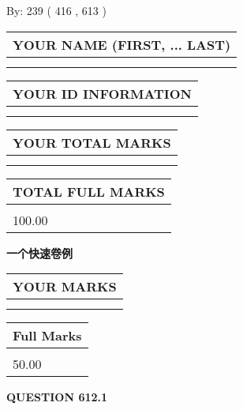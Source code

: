 \documentclass{ctexart}
\begin{document}
   
\hspace{1.0in} By: 
 239 ( 416 ,  613 )
   
   
   
   
\newpage 
\setcounter{page}{ 
   612001 } 
   
   
   
   
\noindent\begin{tabular}{|l|}
\hline
YOUR NAME (FIRST, ... LAST)  \\
\hline
 \\ 
 \\ 
\hline
\end{tabular}
\hspace{0.05in} \begin{tabular}{|l|}
\hline
 YOUR   ID   INFORMATION  \\
\hline
 \\ 
 \\ 
\hline
\end{tabular}
   
   
\vspace{0.2in}\noindent\begin{tabular}{|l|}
\hline
YOUR TOTAL MARKS  \\
\hline
 \\ 
 \\ 
\hline
\end{tabular}
\hspace{0.05in} \begin{tabular}{|l|}
\hline
TOTAL FULL MARKS  \\
\hline
 \\ 
100.00 \\
\hline
\end{tabular}
   
   
 \vspace{0.2in}
{\LARGE {\textbf{ 一个快速卷例}}}
   
   
  
\vspace{0.2in}
  
\noindent\begin{tabular}{|l|}
\hline
 YOUR MARKS  \\
\hline
 \\ 
 \\ 
\hline
\end{tabular}
\hspace{0.05in} \begin{tabular}{|l|}
\hline
 Full Marks  \\
\hline
 \\ 
50.00 \\
\hline
\end{tabular}
{\textbf{\Large{QUESTION
612.1 
}}}
  
\end{document}
